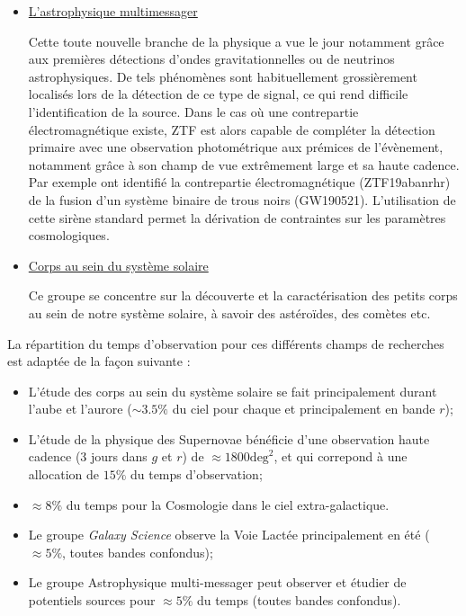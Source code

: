 \documentclass[../main/main.tex]{subfiles}
\begin{document}
\begin{itemize}[label=$\bullet$]
    \item \underline{L'astrophysique multimessager}

      Cette toute nouvelle branche de la physique a vue le jour notamment grâce aux
      premières détections d'ondes gravitationnelles ou de neutrinos astrophysiques. De
      tels phénomènes sont habituellement grossièrement localisés lors de
      la détection de ce type de signal, ce qui rend difficile
      l'identification de la source. Dans le cas où une contrepartie
      électromagnétique existe, ZTF est alors capable de compléter la
      détection primaire avec une observation photométrique aux prémices de
      l'évènement, notamment grâce à son champ de vue extrêmement
      large et sa haute cadence. Par exemple \citet{Chen2022}
      ont identifié la contrepartie électromagnétique (ZTF19abanrhr) de
      la fusion
      d'un système binaire de trous noirs (GW190521). L'utilisation de cette sirène
      standard permet la dérivation de contraintes sur les paramètres cosmologiques.

    \item \underline{Corps au sein du système solaire}

      Ce groupe se concentre sur la découverte et la caractérisation des
      petits corps au sein de notre système solaire, à savoir des
      astéroïdes, des comètes etc.
\end{itemize}

La répartition du temps d'observation pour ces différents champs de
recherches est adaptée de la façon suivante \citep{Bellm19b}:

\begin{itemize}[label=$\diamondsuit$]
  \itemsep0em 
\item L'étude des corps au sein
  du système solaire se fait principalement durant l'aube et l'aurore
  ($\sim3.5\%$ du ciel pour chaque et principalement en bande $r$);
\item L'étude de la physique des Supernovae bénéficie d'une observation
  haute cadence (3 jours dans $g$ et $r$) de $\approx1800\text{deg}^{2}$, et qui correpond à une
  allocation de $15\%$ du temps d'observation;
\item  $\approx8\%$ du temps pour la Cosmologie dans le ciel extra-galactique.
\item Le groupe \textit{Galaxy Science} observe la Voie Lactée principalement en
  été ($\approx5\%$, toutes bandes confondus);
\item Le groupe Astrophysique multi-messager peut observer et étudier de
  potentiels sources pour $\approx5\%$ du temps (toutes bandes confondus).
\end{itemize}
\end{document}
